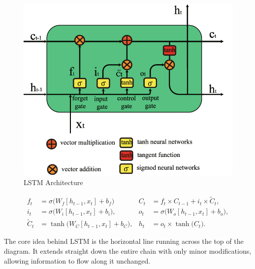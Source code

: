 \documentclass[11pt]{article}
\begin{document}
\begin{figure}[H]
    \centering
    \includegraphics[scale=0.45]{LSTM.png} %
    \caption{LSTM Architecture}
    \label{fig:myimage}
\end{figure}


{\small
\[
    \begin{aligned}
        f_t &= \sigma\bigl(W_f [h_{t-1}, x_t] + b_f\bigr) &C_t &= f_t \times C_{t-1} + i_t \times \tilde{C}_t,\\
        i_t &= \sigma\bigl(W_i [h_{t-1}, x_t] + b_i\bigr), &o_t &= \sigma\bigl(W_o [h_{t-1}, x_t] + b_o\bigr),\\
        \tilde{C}_t &= \tanh\bigl(W_C [h_{t-1}, x_t] + b_C\bigr), &h_t &= o_t \times \tanh\bigl(C_t\bigr).
    \end{aligned}
\]

}



The core idea behind LSTM is the horizontal line running across the top of the diagram. It extends straight down the entire chain with only minor modifications, allowing information to flow along it unchanged.
\end{document}
